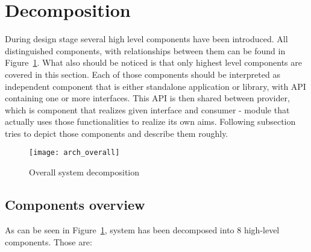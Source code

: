 %


\section{Decomposition}
\label{sec:arch_decomposition}

During design stage several high level components have been introduced. All distinguished components, with
relationships between them can be found in Figure~\ref{fig:arch_overall}. What also should be noticed is that
only highest level components are covered in this section. Each of those components should be interpreted as
independent component that is either standalone application or library, with API containing one or more
interfaces. This API is then shared between provider, which is component that realizes given interface and consumer -
module that actually uses those functionalities to realize its own aims.
Following subsection tries to depict those components and describe them roughly. 

\begin{figure}[h]
  \centering
  \texttt{[image: arch\_overall]}
  \caption{Overall system decomposition}
  \label{fig:arch_overall}
\end{figure}

\subsection{Components overview}
 
As can be seen in Figure~\ref{fig:arch_overall}, system has been decomposed into 8 high-level components. Those are:

